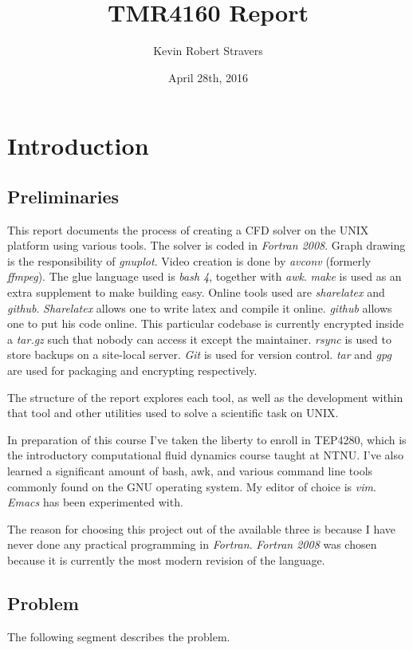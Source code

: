 \documentclass[listof=totoc]{report}
\title{TMR4160 Report}
\author{Kevin Robert Stravers}
\date{April 28th, 2016}
\begin{document}
\maketitle

\tableofcontents
\lstlistoflistings

\chapter{Introduction}
\section{Preliminaries}
This report documents the process of creating a CFD solver on the UNIX platform using various tools. The solver is coded in \emph{Fortran 2008}. Graph drawing is the responsibility of \emph{gnuplot}. Video creation is done by \emph{avconv} (formerly \emph{ffmpeg}). The glue language used is \emph{bash 4}, together with \emph{awk}. \emph{make} is used as an extra supplement to make building easy. Online tools used are \emph{sharelatex} and \emph{github}. \emph{Sharelatex} allows one to write latex and compile it online. \emph{github} allows one to put his code online. This particular codebase is currently encrypted inside a \emph{tar.gz} such that nobody can access it except the maintainer. \emph{rsync} is used to store backups on a site-local server. \emph{Git} is used for version control. \emph{tar} and \emph{gpg} are used for packaging and encrypting respectively.

The structure of the report explores each tool, as well as the development within that tool and other utilities used to solve a scientific task on UNIX.

In preparation of this course I've taken the liberty to enroll in TEP4280, which is the introductory computational fluid dynamics course taught at NTNU. I've also learned a significant amount of bash, awk, and various command line tools commonly found on the GNU operating system. My editor of choice is \emph{vim}. \emph{Emacs} has been experimented with.

The reason for choosing this project out of the available three is because I have never done any practical programming in \emph{Fortran}. \emph{Fortran 2008} was chosen because it is currently the most modern revision of the language.

\section{Problem}
The following segment describes the problem.
\end{document}
